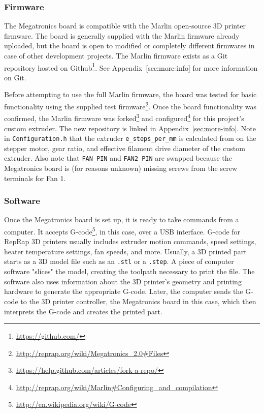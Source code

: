 \subsubsection{Firmware}
The Megatronics board is compatible with the Marlin open-source 3D printer firmware. The board is generally supplied with the Marlin firmware already uploaded, but the board is open to modified or completely different firmwares in case of other development projects. The Marlin firmware exists as a Git repository hosted on Github\footnote{\url{https://github.com/}}. See Appendix~\ref{sec:more-info} for more information on Git.

Before attempting to use the full Marlin firmware, the board was tested for basic functionality using the supplied test firmware\footnote{\url{http://reprap.org/wiki/Megatronics_2.0\#Files}}. Once the board functionality was confirmed, the Marlin firmware was forked\footnote{\url{https://help.github.com/articles/fork-a-repo/}} and configured\footnote{\url{http://reprap.org/wiki/Marlin\#Configuring_and_compilation}} for this project's custom extruder. The new repository is linked in Appendix~\ref{sec:more-info}. Note in \verb|Configuration.h| that the extruder \verb|e_steps_per_mm| is calculated from on the stepper motor, gear ratio, and effective filament drive diameter of the custom extruder. Also note that \verb|FAN_PIN| and \verb|FAN2_PIN| are swapped because the Megatronics board is (for reasons unknown) missing screws from the screw terminals for Fan 1.

\subsubsection{Software}
Once the Megatronics board is set up, it is ready to take commands from a computer. It accepts G-code\footnote{\url{http://en.wikipedia.org/wiki/G-code}}, in this case, over a USB interface. G-code for RepRap 3D printers usually includes extruder motion commands, speed settings, heater temperature settings, fan speeds, and more. Usually, a 3D printed part starts as a 3D model file such as an \verb|.stl| or a \verb|.step|. A piece of computer software "slices" the model, creating the toolpath necessary to print the file. The software also uses information about the 3D printer's geometry and printing hardware to generate the appropriate G-code. Later, the computer sends the G-code to the 3D printer controller, the Megatronics board in this case, which then interprets the G-code and creates the printed part.


